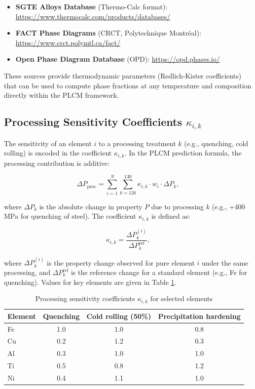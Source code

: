 \documentclass[12pt,a4paper]{article}
\begin{document}
	\begin{itemize}
		\item \textbf{SGTE Alloys Database} (Thermo-Calc format): \url{https://www.thermocalc.com/products/databases/}
		\item \textbf{FACT Phase Diagrams} (CRCT, Polytechnique Montréal): \url{https://www.crct.polymtl.ca/fact/}
		\item \textbf{Open Phase Diagram Database} (OPD): \url{https://opd.phases.io/}
	\end{itemize}
	
	These sources provide thermodynamic parameters (Redlich‑Kister coefficients) that can be used to compute phase fractions at any temperature and composition directly within the PLCM framework.
	
	\subsection{Processing Sensitivity Coefficients \(\kappa_{i,k}\)}
	\label{subsec:processing-coefficients}
	
	The sensitivity of an element \(i\) to a processing treatment \(k\) (e.g., quenching, cold rolling) is encoded in the coefficient \(\kappa_{i,k}\). In the PLCM prediction formula, the processing contribution is additive:
	
	\begin{equation}
		\Delta P_{\text{proc}} = \sum_{i=1}^{N} \sum_{k=126}^{130} \kappa_{i,k} \cdot w_i \cdot \Delta P_k,
		\label{eq:proc-contribution}
	\end{equation}
	
	where \(\Delta P_k\) is the absolute change in property \(P\) due to processing \(k\) (e.g., +400 MPa for quenching of steel). The coefficient \(\kappa_{i,k}\) is defined as:
	
	\begin{equation}
		\kappa_{i,k} = \frac{\Delta P_k^{(i)}}{\Delta P_k^{\text{ref}}},
		\label{eq:kappa-proc-def}
	\end{equation}
	
	where \(\Delta P_k^{(i)}\) is the property change observed for pure element \(i\) under the same processing, and \(\Delta P_k^{\text{ref}}\) is the reference change for a standard element (e.g., Fe for quenching). Values for key elements are given in Table \ref{tab:kappa-proc}.
	
	\begin{table}[htbp]
		\centering
		\caption{Processing sensitivity coefficients \(\kappa_{i,k}\) for selected elements}
		\label{tab:kappa-proc}
		\begin{tabular}{lccc}
			\toprule
			Element & Quenching & Cold rolling (50\%) & Precipitation hardening \\
			\midrule
			Fe & 1.0 & 1.0 & 0.8 \\
			Cu & 0.2 & 1.2 & 0.3 \\
			Al & 0.3 & 1.0 & 1.0 \\
			Ti & 0.5 & 0.8 & 1.2 \\
			Ni & 0.4 & 1.1 & 1.0 \\
			\bottomrule
		\end{tabular}
	\end{table}
	
\end{document}
